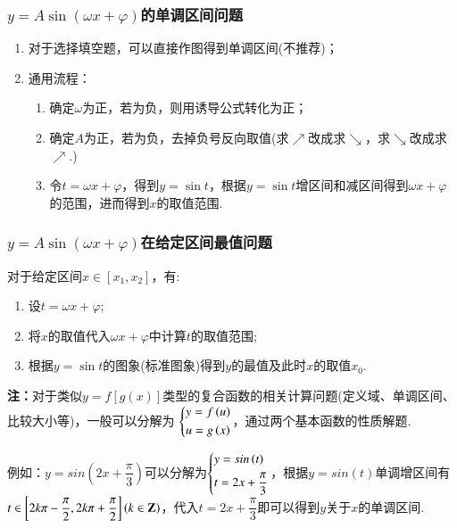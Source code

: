 \documentclass{BHCexam}
\begin{document}
\subsubsection*{$y=A\sin\left(\omega x+\varphi\right)$的单调区间问题}
\begin{enumerate}[1)]
\item 对于选择填空题，可以直接作图得到单调区间(不推荐)；
\item 通用流程：\begin{enumerate}[1)]
\item 确定$ \omega $为正，若为负，则用诱导公式转化为正；
\item 确定$ A $为正，若为负，去掉负号反向取值(求$\nearrow$改成求$ \searrow $，求$ \searrow $改成求$ \nearrow $.)
\item 令$ t=\omega x+\varphi $，得到$ y=\sin t $，根据$ y=\sin t $增区间和减区间得到$ \omega x+\varphi $的范围，进而得到$ x $的取值范围.
\end{enumerate}
\end{enumerate}
\subsubsection*{$y=A\sin\left(\omega x+\varphi\right)$在给定区间最值问题}\label{123}
对于给定区间$ x\in\left[x_1,x_2\right] $，有:
\begin{enumerate}
\item 设$ t=\omega x+\varphi $;
\item 将$ x $的取值代入$ \omega x+\varphi $中计算$ t$的取值范围;
\item 根据$ y=\sin t $的图象(标准图象)得到$ y $的最值及此时$ x $的取值$ x_0 $.
\end{enumerate}
{\kaishu \textbf{注：}对于类似$ y=f\left[g\left(x\right)\right] $类型的复合函数的相关计算问题(定义域、单调区间、比较大小等)，一般可以分解为 $\begin{dcases}
		y=f\left(u\right)\\
		u=g\left(x\right)
	\end{dcases} $，通过两个基本函数的性质解题.\par
例如：$ y=sin\left(2x+\dfrac{\pi}{3}\right) $可以分解为$\begin{dcases}
	y=sin\left(t\right)\\
	t=2x+\dfrac{\pi}{3}
	\end{dcases}$，根据$ y=sin\left(t\right) $单调增区间有$ t\in\left[2k\pi-\dfrac{\pi}{2},2k\pi+\dfrac{\pi}{2}\right] \left(k\in\mathbf{Z}\right)$，代入$ t=2x+\dfrac{\pi}{3} $即可以得到$ y $关于$ x $的单调区间.

}%
\end{document}
